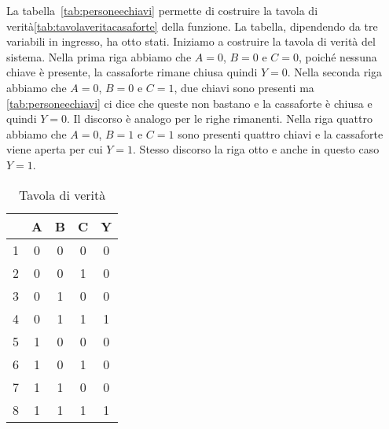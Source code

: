 La tabella~\vref{tab:personeechiavi} permette di costruire la tavola di verità\nobs\vref{tab:tavolaveritacasaforte} della funzione. La tabella, dipendendo da tre variabili in ingresso, ha otto stati. Iniziamo a costruire la tavola di verità del sistema. Nella prima riga abbiamo che $A=0$, $B=0$ e $C=0$, poiché nessuna chiave è presente, la cassaforte rimane chiusa quindi $Y=0$. Nella seconda riga abbiamo che $A=0$, $B=0$ e $C=1$,  due chiavi sono presenti ma \nobs\vref{tab:personeechiavi} ci dice che queste non bastano e la cassaforte è chiusa e quindi $Y=0$. Il discorso è analogo  per le righe rimanenti. Nella riga quattro abbiamo che $A=0$, $B=1$ e $C=1$  sono presenti quattro chiavi e la cassaforte viene aperta per cui $Y=1$.  Stesso discorso la riga otto e anche in questo caso $Y=1$.
\begin{table}
		\centering
\begin{tabular}{c|c|c|c|c}
	& \textbf{A} & \textbf{B} & \textbf{C} & \textbf{Y} \\
	\toprule 
	1& 0 & 0 & 0 & 0 \\ 
	2& 0 & 0 & 1 &  0\\ 
	3& 0 & 1 & 0 &  0\\ 
	4& 0 & 1 & 1 &  1\\ 
	5& 1 & 0 & 0 &  0\\ 
	6& 1 & 0 & 1 &  0\\ 
	7& 1 & 1 & 0 &  0\\ 
	8& 1 & 1 & 1 &  1\\ 
	\bottomrule
\end{tabular} 
	\caption{Tavola di verità}
	\label{tab:tavolaveritacasaforte}
\end{table}
